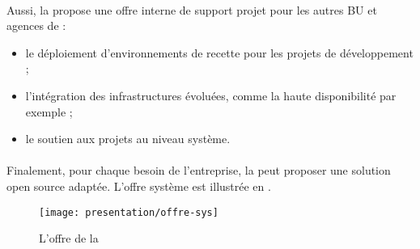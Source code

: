 \paragraph{}
Aussi, la \abusys{} propose une offre interne de support projet pour les autres BU et agences de
\asmile{} :

\begin{itemize}
	\item le déploiement d'environnements de recette pour les projets de développement ;
	\item l'intégration des infrastructures évoluées, comme la haute disponibilité par exemple ;
	\item le soutien aux projets au niveau système.
\end{itemize}

\paragraph{}
Finalement, pour chaque besoin de l'entreprise, la \abusys{} peut proposer une solution open source adaptée.
L'offre système est illustrée en .

\begin{figure}
	\centering
	\texttt{[image: presentation/offre-sys]}
	\caption{L'offre de la \abusys}
	\label{figure:presentation:offre-sys}
\end{figure}

